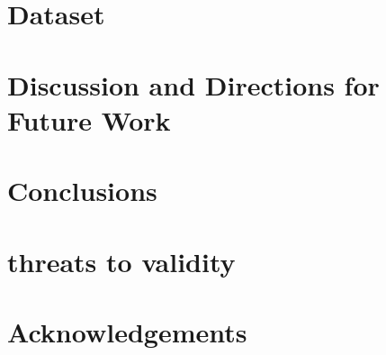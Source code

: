 \documentclass[sigconf]{acmart}
\begin{document}
\section{Dataset}
\section{Discussion and Directions for Future Work}
\section{Conclusions}
\section*{threats to validity}


\section*{Acknowledgements}




\end{document}
